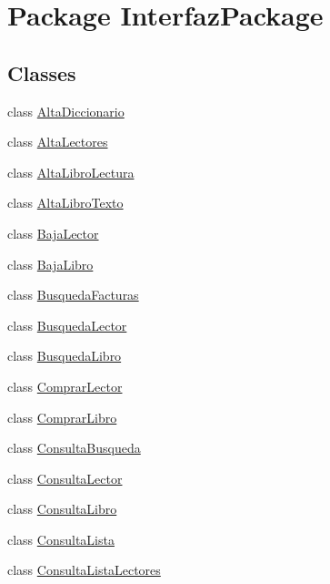 \hypertarget{namespace_interfaz_package}{}\section{Package Interfaz\+Package}
\label{namespace_interfaz_package}
\subsection*{Classes}
\begin{DoxyCompactItemize}
\item 
class \mbox{\hyperlink{class_interfaz_package_1_1_alta_diccionario}{Alta\+Diccionario}}
\item 
class \mbox{\hyperlink{class_interfaz_package_1_1_alta_lectores}{Alta\+Lectores}}
\item 
class \mbox{\hyperlink{class_interfaz_package_1_1_alta_libro_lectura}{Alta\+Libro\+Lectura}}
\item 
class \mbox{\hyperlink{class_interfaz_package_1_1_alta_libro_texto}{Alta\+Libro\+Texto}}
\item 
class \mbox{\hyperlink{class_interfaz_package_1_1_baja_lector}{Baja\+Lector}}
\item 
class \mbox{\hyperlink{class_interfaz_package_1_1_baja_libro}{Baja\+Libro}}
\item 
class \mbox{\hyperlink{class_interfaz_package_1_1_busqueda_facturas}{Busqueda\+Facturas}}
\item 
class \mbox{\hyperlink{class_interfaz_package_1_1_busqueda_lector}{Busqueda\+Lector}}
\item 
class \mbox{\hyperlink{class_interfaz_package_1_1_busqueda_libro}{Busqueda\+Libro}}
\item 
class \mbox{\hyperlink{class_interfaz_package_1_1_comprar_lector}{Comprar\+Lector}}
\item 
class \mbox{\hyperlink{class_interfaz_package_1_1_comprar_libro}{Comprar\+Libro}}
\item 
class \mbox{\hyperlink{class_interfaz_package_1_1_consulta_busqueda}{Consulta\+Busqueda}}
\item 
class \mbox{\hyperlink{class_interfaz_package_1_1_consulta_lector}{Consulta\+Lector}}
\item 
class \mbox{\hyperlink{class_interfaz_package_1_1_consulta_libro}{Consulta\+Libro}}
\item 
class \mbox{\hyperlink{class_interfaz_package_1_1_consulta_lista}{Consulta\+Lista}}
\item 
class \mbox{\hyperlink{class_interfaz_package_1_1_consulta_lista_lectores}{Consulta\+Lista\+Lectores}}

\end{DoxyCompactItemize}
